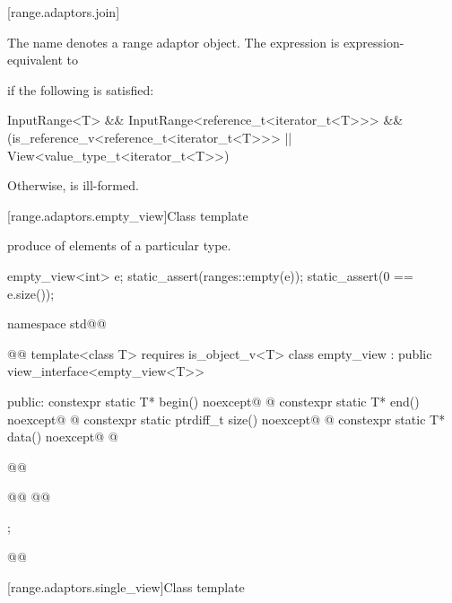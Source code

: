 [range.adaptors.join]{}

\pnum
The name  denotes a range adaptor
object.  The expression
  is
expression-equivalent to 
{\color{oldclr}
if the following is satisfied:
\begin{codeblock}
InputRange<T> &&
InputRange<reference_t<iterator_t<T>>> &&
(is_reference_v<reference_t<iterator_t<T>>> ||
 View<value_type_t<iterator_t<T>>)
\end{codeblock}
Otherwise,  is ill-formed.
} %

[range.adaptors.empty_view]{Class template }

\pnum
{}   produce
  of  elements of
a particular type.

\pnum
\begin{example}
\begin{codeblock}
empty_view<int> e;
static_assert(ranges::empty(e));
static_assert(0 == e.size());
\end{codeblock}
\end{example}

\begin{codeblock}
namespace std@@ { @@
  template<class T>
    requires is_object_v<T>
  class empty_view : public view_interface<empty_view<T>> {
  public:
    constexpr static T* begin() noexcept@\oldtxt{;} @
    constexpr static T* end() noexcept@\oldtxt{;} @
    constexpr static ptrdiff_t size() noexcept@\oldtxt{;} @
    constexpr static T* data() noexcept@\oldtxt{;} @

    @@

    @@
    @@
  };
}@\oldtxt{\}}@
\end{codeblock}

[range.adaptors.single_view]{Class template }

